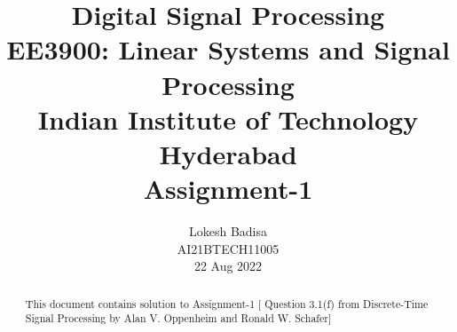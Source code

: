 \documentclass[journal,12pt,twocolumn]{IEEEtran}
\numberwithin{equation}{section}
\begin{document}
                             
\title{ Digital Signal Processing \\ \Large EE3900: Linear Systems and Signal Processing \\ \large Indian Institute of Technology Hyderabad \\ \vspace*{12pt} \textbf{Assignment-1}}
\author{Lokesh Badisa \\ \normalsize AI21BTECH11005 \\ \vspace*{20pt} \normalsize 22 Aug 2022}   
 \maketitle 
 \begin{abstract}
 This document contains solution to Assignment-1 [ Question 3.1(f) from Discrete-Time Signal Processing by Alan V. Oppenheim and Ronald W. Schafer]
 \end{abstract}
\end{document}
